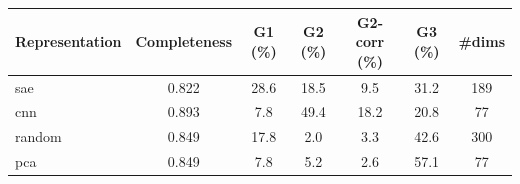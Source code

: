 \begin{tabular}{lcccccc}
\toprule
Representation & Completeness & G1 (\%) & G2 (\%) & G2-corr (\%) & G3 (\%) & \#dims \\
\midrule
sae & 0.822 & 28.6 & 18.5 & 9.5 & 31.2 & 189 \\
cnn & 0.893 & 7.8 & 49.4 & 18.2 & 20.8 & 77 \\
random & 0.849 & 17.8 & 2.0 & 3.3 & 42.6 & 300 \\
pca & 0.849 & 7.8 & 5.2 & 2.6 & 57.1 & 77 \\
\bottomrule
\end{tabular}